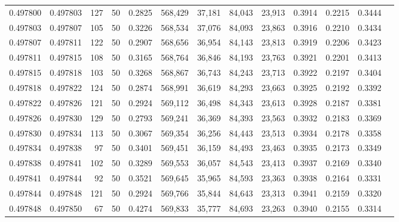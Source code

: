 \begin{tabular}{rrrrrrrrrrrrr}
0.497800 & 0.497803 &   127 &  50 &                                     0.2825 & 568,429 &  37,181 &  84,043 &  23,913 & 0.3914 & 0.2215 & 0.3444 \\
0.497803 & 0.497807 &   105 &  50 &                                     0.3226 & 568,534 &  37,076 &  84,093 &  23,863 & 0.3916 & 0.2210 & 0.3434 \\
0.497807 & 0.497811 &   122 &  50 &                                     0.2907 & 568,656 &  36,954 &  84,143 &  23,813 & 0.3919 & 0.2206 & 0.3423 \\
0.497811 & 0.497815 &   108 &  50 &                                     0.3165 & 568,764 &  36,846 &  84,193 &  23,763 & 0.3921 & 0.2201 & 0.3413 \\
0.497815 & 0.497818 &   103 &  50 &                                     0.3268 & 568,867 &  36,743 &  84,243 &  23,713 & 0.3922 & 0.2197 & 0.3404 \\
0.497818 & 0.497822 &   124 &  50 &                                     0.2874 & 568,991 &  36,619 &  84,293 &  23,663 & 0.3925 & 0.2192 & 0.3392 \\
0.497822 & 0.497826 &   121 &  50 &                                     0.2924 & 569,112 &  36,498 &  84,343 &  23,613 & 0.3928 & 0.2187 & 0.3381 \\
0.497826 & 0.497830 &   129 &  50 &                                     0.2793 & 569,241 &  36,369 &  84,393 &  23,563 & 0.3932 & 0.2183 & 0.3369 \\
0.497830 & 0.497834 &   113 &  50 &                                     0.3067 & 569,354 &  36,256 &  84,443 &  23,513 & 0.3934 & 0.2178 & 0.3358 \\
0.497834 & 0.497838 &    97 &  50 &                                     0.3401 & 569,451 &  36,159 &  84,493 &  23,463 & 0.3935 & 0.2173 & 0.3349 \\
0.497838 & 0.497841 &   102 &  50 &                                     0.3289 & 569,553 &  36,057 &  84,543 &  23,413 & 0.3937 & 0.2169 & 0.3340 \\
0.497841 & 0.497844 &    92 &  50 &                                     0.3521 & 569,645 &  35,965 &  84,593 &  23,363 & 0.3938 & 0.2164 & 0.3331 \\
0.497844 & 0.497848 &   121 &  50 &                                     0.2924 & 569,766 &  35,844 &  84,643 &  23,313 & 0.3941 & 0.2159 & 0.3320 \\
0.497848 & 0.497850 &    67 &  50 &                                     0.4274 & 569,833 &  35,777 &  84,693 &  23,263 & 0.3940 & 0.2155 & 0.3314 \\

\end{tabular}
